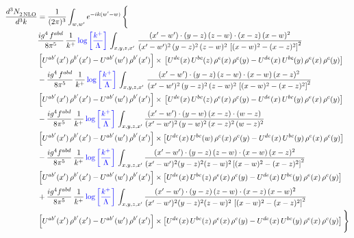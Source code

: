 \documentclass[9pt]{article}
\numberwithin{equation}{section}
\begin{document}
\begin{align}
   \frac{d^{3}N_{2\,\rm NLO}^{\rm}}{d^{3}k}  & = \frac{1}{(2\pi)^{3}}  \int_{w, w^\prime} e^{-ik(w^\prime-w)}\, \Bigg\{\notag \\ &  \frac{ig^{4}\, f^{abd}}{8\pi^{5}}\, \frac{1}{k^{+}}\,{\color{blue}\log{\left[\frac{k^{+}}{\Lambda}\right]}}\, \int_{x,y,z,x'}\,\frac{(x'-w')\cdot  (y-z)\, (z-w)\cdot (x-z)\, (x-w)^{2}}{(x'-w')^{2}\, (y-z)^{2}\, (z-w)^{2}\,\left[(x-w)^{2}-(x-z)^{2}\right]^{2}}\, \notag \\ & \left[U^{ab'}(x')\,\rho^{b'}(x')-U^{ab'}(w')\, \rho^{b'}(x')\right]\times\,\left[U^{de}(x)\,U^{bc}(z)\, \rho^{e}(x)\,\rho^{c}(y)-U^{de}(x)\,U^{bc}(y)\,\rho^{e}(x)\,\rho^{c}(y)\right]\notag \\ &   - \frac{ig^{4}\, f^{abd}}{8\pi^{5}}\, \frac{1}{k^{+}}\,{\color{blue}\log{\left[\frac{k^{+}}{\Lambda}\right]}}\, \int_{x,y,z,x'}\,\frac{(x'-w')\cdot  (y-z)\, (z-w)\cdot (x-w)\, (x-z)^{2}}{(x'-w')^{2}\, (y-z)^{2}\, (z-w)^{2}\,\left[(x-w)^{2}-(x-z)^{2}\right]^{2}}\, \notag \\ & \left[U^{ab'}(x')\,\rho^{b'}(x')-U^{ab'}(w')\, \rho^{b'}(x')\right]\times\,\left[U^{de}(x)\,U^{bc}(z)\, \rho^{e}(x)\,\rho^{c}(y)-U^{de}(x)\,U^{bc}(y)\,\rho^{e}(x)\,\rho^{c}(y)\right]\notag \\ & -\frac{ig^{4}f^{abd}}{8\pi^{5}}\,\frac{1}{k^{+}}\,{\color{blue}\log{\left[\frac{k^{+}}{\Lambda}\right]}}\,\int_{x,y,z,x'}
\frac{(x'-w')\cdot (y-w)\, (x-z)\cdot (w-z)}{(x'-w')^{2}\, (y-w)^{2}\, (x-z)^{2}\, (w-z)^{2}}\notag \\ & \left[U^{ab'}(x')\,\rho^{b'}(x')-U^{ab'}(w')\, \rho^{b'}(x')\right]\times \left[U^{de}(x)\,U^{bc}(w)\, \rho^{e}(x)\,\rho^{c}(y)-U^{de}(x)\,U^{bc}(y)\,\rho^{e}(x)\,\rho^{c}(y)\right]\notag \\ & -\frac{ig^{4}f^{abd}}{8\pi^{5}}\,\frac{1}{k^{+}}\,{\color{blue}\log{\left[\frac{k^{+}}{\Lambda}\right]}}\,\int_{x,y,z,x'}
\frac{(x'-w')\cdot(y-z)\,(z-w)\cdot(x-w)\,(x-z)^{2}}{(x'-w')^{2}(y-z)^{2}(z-w)^{2}\left[(x-w)^{2}-(x-z)^{2}\right]^{2}}\notag \\ & \left[U^{ab'}(x')\,\rho^{b'}(x')-U^{ab'}(w')\, \rho^{b'}(x')\right]\times \left[U^{de}(x)\,U^{bc}(z)\, \rho^{e}(x)\,\rho^{c}(y)-U^{de}(x)\,U^{bc}(y)\,\rho^{e}(x)\,\rho^{c}(y)\right]\notag \\ & +\frac{ig^{4}f^{abd}}{8\pi^{5}}\,\frac{1}{k^{+}}\,{\color{blue}\log{\left[\frac{k^{+}}{\Lambda}\right]}}\,\int_{x,y,z,x'}
\frac{(x'-w')\cdot(y-z)\,(z-w)\cdot(x-z)\,(x-w)^{2}}{(x'-w')^{2}(y-z)^{2}(z-w)^{2}\,\left[(x-w)^{2}-(x-z)^{2}\right]^{2}}\notag \\ & \left[U^{ab'}(x')\,\rho^{b'}(x')-U^{ab'}(w')\, \rho^{b'}(x')\right]\times \left[U^{de}(x)\,U^{bc}(z)\, \rho^{e}(x)\,\rho^{c}(y)-U^{de}(x)\,U^{bc}(y)\,\rho^{e}(x)\,\rho^{c}(y)\right]\Bigg\} 
\end{align}   
\end{document}
